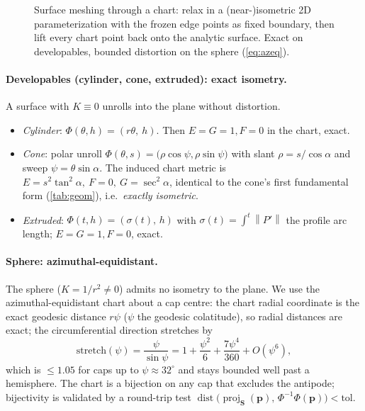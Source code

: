 \documentclass[11pt,a4paper]{article}
\numberwithin{equation}{section}
\newcommand{\norm}[1]{\left\lVert #1 \right\rVert}
\newcommand{\vv}[1]{\mathbf{#1}}
\DeclareMathOperator{\proj}{proj}
\DeclareMathOperator{\dist}{dist}
\begin{document}
\begin{figure}[H]\centering
{}
\caption{Surface meshing through a chart: relax in a (near-)isometric 2D
parameterization with the frozen edge points as fixed boundary, then lift every
chart point back onto the analytic surface. Exact on developables, bounded
distortion on the sphere (\cref{eq:azeq}).}
\label{fig:chart}
\end{figure}

\paragraph{Developables (cylinder, cone, extruded): exact isometry.}
A surface with $K\equiv0$ unrolls into the plane without distortion.
\begin{itemize}[topsep=2pt,itemsep=1pt]
\item \emph{Cylinder}: $\Phi(\theta,h)=(r\theta,\ h)$. Then $E=G=1,F=0$ in the
chart, exact.
\item \emph{Cone}: polar unroll $\Phi(\theta,s)=\bigl(\rho\cos\psi,\rho\sin\psi
\bigr)$ with slant $\rho=s/\cos\alpha$ and sweep $\psi=\theta\sin\alpha$. The
induced chart metric is $E=s^2\tan^2\alpha,\ F=0,\ G=\sec^2\alpha$, identical
to the cone's first fundamental form (\cref{tab:geom}), i.e.\ \emph{exactly
isometric}.
\item \emph{Extruded}: $\Phi(t,h)=(\sigma(t),\,h)$ with $\sigma(t)=\int^t\norm
{P'}$ the profile arc length; $E=G=1,F=0$, exact.
\end{itemize}

\paragraph{Sphere: azimuthal-equidistant.}
The sphere ($K=1/r^2\neq0$) admits no isometry to the plane. We use the
azimuthal-equidistant chart about a cap centre: the chart radial coordinate is
the exact geodesic distance $r\psi$ ($\psi$ the geodesic colatitude), so radial
distances are exact; the circumferential direction stretches by
\begin{equation}
\label{eq:azeq}
\text{stretch}(\psi)=\frac{\psi}{\sin\psi}
   = 1+\frac{\psi^2}{6}+\frac{7\psi^4}{360}+O(\psi^6),
\end{equation}
which is $\le 1.05$ for caps up to $\psi\approx 32^\circ$ and stays bounded
well past a hemisphere. The chart is a bijection on any cap that excludes the
antipode; bijectivity is validated by a round-trip test
$\dist\!\bigl(\proj_{\vv{S}}(\vv{p}),\,\Phi^{-1}\Phi(\vv{p})\bigr)<\text{tol}$.
\end{document}
